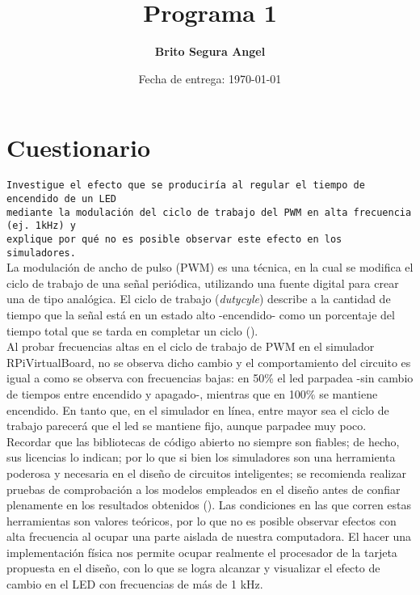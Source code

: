 \documentclass[letterpaper,11.5pt]{article} %
\title{Programa 1}
\author{\textbf{Brito Segura Angel}}
\date{Fecha de entrega: \today}
\begin{document}
    \maketitle %
    
    \pagestyle{empty} %
    \maketitle
    \thispagestyle{empty}
    
    \section{Cuestionario}
    \texttt{Investigue  el  efecto  que  se  produciría  al  regular  el  tiempo  de  encendido  de  un  LED\\mediante  la  modulación  del  ciclo  de  trabajo  del  PWM  en  alta  frecuencia  (ej.  1kHz)  y\\explique por qué no es posible observar este efecto en los simuladores.}\\[1.5em]    
    La modulación de ancho de pulso (PWM) es una técnica, en la cual se modifica el ciclo de trabajo de una señal periódica, utilizando una fuente digital para crear una de tipo analógica. El ciclo de trabajo (\textit{dutycyle}) describe a la cantidad de tiempo que la señal está en un estado alto -encendido- como un porcentaje del tiempo total que se tarda en completar un ciclo (\cite{tinkercard}).\\

    Al probar frecuencias altas en el ciclo de trabajo de PWM en el simulador RPiVirtualBoard, no se observa dicho cambio y el comportamiento del circuito es igual a como se observa con frecuencias bajas: en 50\% el led parpadea -sin cambio de tiempos entre encendido y apagado-, mientras que en 100\% se mantiene encendido. En tanto que, en el simulador en línea, entre mayor sea el ciclo de trabajo parecerá que el led se mantiene fijo, aunque parpadee muy poco.\\
    
    Recordar que las bibliotecas de código abierto no siempre son fiables; de hecho, sus licencias lo indican; por lo que si bien los simuladores son una herramienta poderosa y necesaria en el diseño de circuitos inteligentes; se recomienda realizar pruebas de comprobación a los modelos empleados en el diseño antes de confiar plenamente en los resultados obtenidos (\cite{arduino}). Las condiciones en las que corren estas herramientas son valores teóricos, por lo que no es posible observar efectos con alta frecuencia al ocupar una parte aislada de nuestra computadora. El hacer una implementación física nos permite ocupar realmente el procesador de la tarjeta propuesta en el diseño, con lo que se logra alcanzar y visualizar el efecto de cambio en el LED con frecuencias de más de 1 kHz.\newline
    
    \printbibliography %
\end{document}
